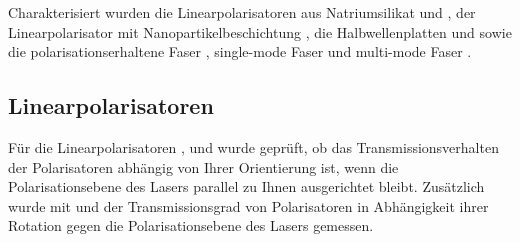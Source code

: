 \documentclass[a4paper,12pt,twoside,parskip=no,headsepline,open=right,ngerman,export]{scrreprt}
\begin{document}
            Charakterisiert wurden die Linearpolarisatoren aus Natriumsilikat  und , der Linearpolarisator mit Nanopartikelbeschichtung , die Halbwellenplatten  und  sowie die polarisationserhaltene Faser , single-mode Faser  und multi-mode Faser .



            \subsection*{Linearpolarisatoren}
            
            Für die Linearpolarisatoren ,  und  wurde geprüft, ob das Transmissionsverhalten der Polarisatoren abhängig von Ihrer Orientierung ist, wenn die Polarisationsebene des Lasers parallel zu Ihnen ausgerichtet bleibt. Zusätzlich wurde mit  und  der Transmissionsgrad von Polarisatoren in Abhängigkeit ihrer Rotation gegen die Polarisationsebene des Lasers gemessen.
            
\end{document}
